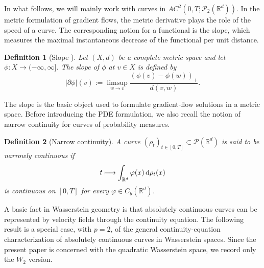\documentclass[11pt,reqno]{amsart}
\numberwithin{figure}{section}
\def\d {{\partial}}
\def\d{\mathrm{d}}
\renewcommand{\d}{  {\textup{d}} }
\newtheorem{definition}{Definition}[section]
\begin{document}
In what follows, we will mainly work with curves in
$AC^2(0,T;\mathcal P_2(\mathbb R^d))$. 
In the metric formulation of gradient flows, the metric derivative plays the
role of the speed of a curve. The corresponding notion for a functional is the
slope, which measures the maximal instantaneous decrease of the functional per
unit distance.

\begin{definition}[Slope {\cite[Definition~1.2.4]{AGS2005}}]
	Let $(X,d)$ be a complete metric space and let $\phi:X\to(-\infty,\infty]$. The slope of $\phi$ at $v\in X$ is defined by
	\[
	|\partial\phi|(v)
	:=
	\limsup_{w\to v}\frac{(\phi(v)-\phi(w))_+}{d(v,w)}.
	\]
\end{definition}

The slope is the basic object used to formulate gradient-flow solutions in a
metric space. Before introducing the PDE formulation, we also recall the
notion of narrow continuity for curves of probability measures.

\begin{definition}[Narrow continuity]
	A curve $(\rho_t)_{t\in[0,T]}\subset\mathcal P(\mathbb R^d)$ is said to be narrowly continuous if
	\[
	t\longmapsto \int_{\mathbb R^d}\varphi(x)\,\d\rho_t(x)
	\]
	is continuous on $[0,T]$ for every $\varphi\in C_b(\mathbb R^d)$.
\end{definition}

A basic fact in Wasserstein geometry is that absolutely continuous curves can be
represented by velocity fields through the continuity equation. The following
result is a special case, with $p=2$, of the general continuity-equation
characterization of absolutely continuous curves in Wasserstein spaces. Since
the present paper is concerned with the quadratic Wasserstein space, we record
only the $W_2$ version.
\end{document}
